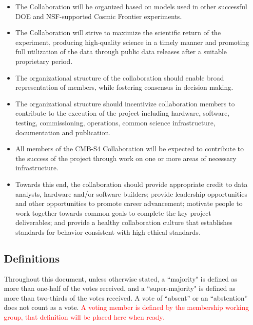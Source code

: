 \documentclass[12pt]{article}
\begin{document}
\begin{itemize}
\item The Collaboration will be organized based on models used in other successful DOE and NSF-supported Cosmic Frontier experiments.

\item The Collaboration will strive to maximize the scientific return of the experiment, producing high-quality science in a timely manner and promoting full utilization of the data through public data releases after a suitable proprietary period.

\item The organizational structure of the collaboration should enable broad representation of members, while fostering consensus in decision making.

\item The organizational structure should incentivize collaboration members to contribute to the execution of the project including hardware, software, testing, commissioning, operations, common science infrastructure, documentation and publication.  

\item All members of the CMB-S4 Collaboration will be expected to contribute to the success of the project through work on one or more areas of necessary infrastructure.

\item Towards this end, the collaboration should provide appropriate credit to data analysts, hardware and/or software builders; provide leadership opportunities and other opportunities to promote career advancement; motivate people to work together towards common goals to complete the key project deliverables; and provide a healthy collaboration culture that establishes standards for behavior consistent with high ethical standards.

\end{itemize}


\subsection{Definitions}

Throughout this document, unless otherwise stated, a ``majority" is defined as more than one-half of the votes received, and a ``super-majority" is defined as more than two-thirds of the votes received. A vote of ``absent'' or an ``abstention'' does not count as a vote. \textcolor{red}{A voting member is defined by the membership working group, that definition will be placed here when ready.}
\end{document}
